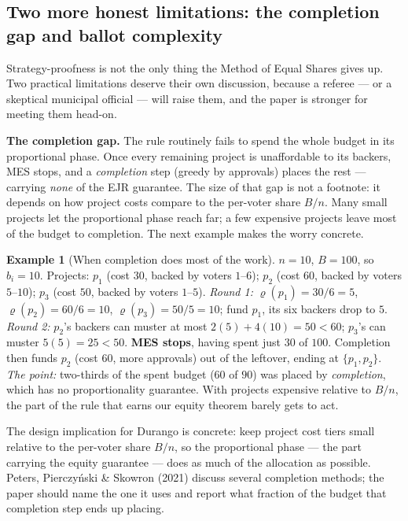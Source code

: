 \documentclass[11pt,letterpaper]{article}
\theoremstyle{definition}
\newtheorem{example}{Example}[section]
\theoremstyle{plain}
\theoremstyle{remark}
\newcommand{\budget}{B}
\newcommand{\mesrho}{\varrho}      %
\providecommand{\citet}[1]{Peters, Pierczy\'nski \& Skowron (2021)}
\begin{document}
\subsection{Two more honest limitations: the completion gap and ballot complexity}

Strategy-proofness is not the only thing the Method of Equal Shares gives up. Two practical
limitations deserve their own discussion, because a referee --- or a skeptical municipal official ---
will raise them, and the paper is stronger for meeting them head-on.

\medskip\noindent\textbf{The completion gap.} The rule routinely fails to spend the whole budget in
its proportional phase. Once every remaining project is unaffordable to its backers, MES stops, and a
\emph{completion} step (greedy by approvals) places the rest --- carrying \emph{none} of the EJR
guarantee. The size of that gap is not a footnote: it depends on how project costs compare to the
per-voter share $\budget/n$. Many small projects let the proportional phase reach far; a few expensive
projects leave most of the budget to completion. The next example makes the worry concrete.

\begin{example}[When completion does most of the work]
\label{ex:completion}
$n=10$, $\budget=100$, so $b_i=10$. Projects: $p_1$ (cost $30$, backed by voters $1$--$6$); $p_2$
(cost $60$, backed by voters $5$--$10$); $p_3$ (cost $50$, backed by voters $1$--$5$).
\emph{Round 1:} $\mesrho(p_1)=30/6=5$, $\mesrho(p_2)=60/6=10$, $\mesrho(p_3)=50/5=10$; fund $p_1$, its
six backers drop to $5$.
\emph{Round 2:} $p_2$'s backers can muster at most $2(5)+4(10)=50<60$; $p_3$'s can muster $5(5)=25<50$.
\textbf{MES stops}, having spent just $30$ of $100$. Completion then funds $p_2$ (cost $60$, more
approvals) out of the leftover, ending at $\{p_1,p_2\}$.
\emph{The point:} two-thirds of the spent budget ($60$ of $90$) was placed by \emph{completion}, which
has no proportionality guarantee. With projects expensive relative to $\budget/n$, the part of the rule
that earns our equity theorem barely gets to act.
\end{example}

\begin{connection}
The design implication for Durango is concrete: keep project cost tiers small relative to the
per-voter share $\budget/n$, so the proportional phase --- the part carrying the equity guarantee ---
does as much of the allocation as possible. \citet{peters2021} discuss several completion methods; the
paper should name the one it uses and report what fraction of the budget that completion step ends up
placing.
\end{connection}
\end{document}
